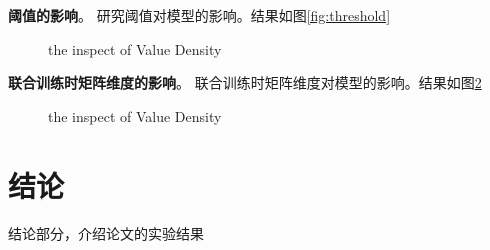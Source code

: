 \documentclass[lang=cn,11pt]{elegantpaper}
\begin{document}
\textbf{阈值的影响}。 研究阈值对模型的影响。结果如图\ref{fig:threshold}
\begin{figure}[htbp]
	\centering
	\quad
	\quad
	\quad
	\caption{ the inspect of Value Density \label{fig:Density}} 
\end{figure}


\textbf{联合训练时矩阵维度的影响}。 联合训练时矩阵维度对模型的影响。结果如图\ref{fig:Density}
\begin{figure}[htbp]
	\centering
	\quad
	\quad
	\quad
	\caption{ the inspect of Value Density \label{fig:Density}} 
\end{figure}


\section{结论}
结论部分，介绍论文的实验结果



\end{document}
